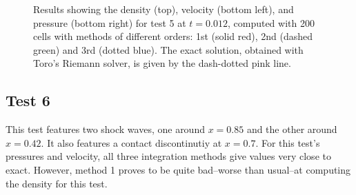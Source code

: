 \documentclass[10pt]{article}
\begin{document}
\begin{figure}[h]
\begin{center}
\begin{tabular}{cc}
	\end{tabular}	
  \end{center}
  \caption{Results showing the density (top), velocity (bottom left), and pressure (bottom right) for test 5 at $t=0.012$, computed with 200 cells with methods of different orders: 1st (solid red), 2nd (dashed green) and 3rd (dotted blue). The exact solution, obtained with Toro's Riemann solver, is given by the dash-dotted pink line.}
  \label{fig:den_T5}
\end{figure}


\subsection{Test 6}
This test features two shock waves, one around $x=0.85$ and the other around $x=0.42$. It also features a contact discontinutiy at $x=0.7$.
For this test's pressures and velocity, all three integration methods give values very close to exact. However, method 1 proves to be quite bad--worse than usual--at computing the density for this test. 
\end{document}
